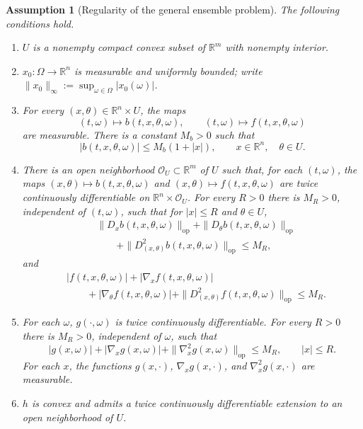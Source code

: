 \documentclass[11pt]{amsart}
\numberwithin{equation}{section} %
\newtheorem{assumption}{Assumption}[section]
\theoremstyle{remark}
\begin{document}
\begin{assumption}[Regularity of the general ensemble problem]
\label{ass:general-first-variation}
The following conditions hold.
\begin{enumerate}
    \item $U$ is a nonempty compact convex subset of $\mathbb R^m$ with nonempty interior.
    \item $x_0:\Omega\to\mathbb R^n$ is measurable and uniformly bounded;
    write $\|x_0\|_\infty:=\sup_{\omega\in\Omega}|x_0(\omega)|$.
    \item For every $(x,\theta)$${}\in\mathbb R^n\times U$, the maps
    \[
        (t,\omega)\mapsto b(t,x,\theta,\omega),\qquad
        (t,\omega)\mapsto f(t,x,\theta,\omega)
    \]
    are measurable. There is a constant $M_b>0$ such that
    \[
        |b(t,x,\theta,\omega)|\le M_b(1+|x|),
        \qquad x\in\mathbb R^n,\quad\theta\in U.
    \]
    \item There is an open neighborhood $\mathcal O_U\subset\mathbb R^m$
    of $U$ such that, for each $(t,\omega)$, the maps
    $(x,\theta)\mapsto b(t,x,\theta,\omega)$ and
    $(x,\theta)\mapsto f(t,x,\theta,\omega)$ are twice continuously
    differentiable on $\mathbb R^n\times\mathcal O_U$.
    For every $R>0$ there is $M_R>0$, independent of $(t,\omega)$, such that
    for $|x|\le R$ and $\theta\in U$,
    \[
        \begin{aligned}
        &\|D_x b(t,x,\theta,\omega)\|_{\mathrm{op}}
        +\|D_\theta b(t,x,\theta,\omega)\|_{\mathrm{op}}
        \\
        &\qquad+\|D^2_{(x,\theta)}b(t,x,\theta,\omega)\|_{\mathrm{op}}\le M_R,
        \end{aligned}
    \]
    and
    \[
        \begin{aligned}
        &|f(t,x,\theta,\omega)|+|\nabla_xf(t,x,\theta,\omega)|
        \\
        &\qquad+|\nabla_\theta f(t,x,\theta,\omega)|
        +\|D^2_{(x,\theta)}f(t,x,\theta,\omega)\|_{\mathrm{op}}\le M_R.
        \end{aligned}
    \]
    \item For each $\omega$, $g(\cdot,\omega)$ is twice continuously
    differentiable. For every $R>0$ there is $M_R>0$, independent of
    $\omega$, such that
    \[
        |g(x,\omega)|+|\nabla_xg(x,\omega)|
        +\|\nabla_x^2g(x,\omega)\|_{\mathrm{op}}\le M_R,\qquad |x|\le R.
    \]
    For each $x$, the functions $g(x,\cdot)$, $\nabla_xg(x,\cdot)$,
    and $\nabla_x^2g(x,\cdot)$ are measurable.
    \item $h$ is convex and admits a twice continuously differentiable
    extension to an open neighborhood of $U$.
\end{enumerate}
\end{assumption}
\end{document}
